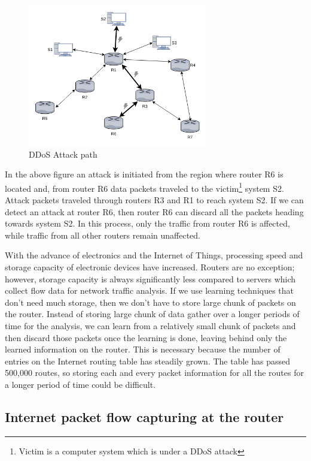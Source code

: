 \documentclass[12pt,oneside,a4paper]{article}
\begin{document}
\begin{figure}[H]
\centering
\includegraphics[width=0.70\textwidth]{attack_path.png}
\caption{DDoS Attack path} \label{fig:attackpath}
\end{figure}


In the above figure an attack is initiated from the region where router R6 is located and, from router R6 data packets traveled to the victim\footnote{Victim is a computer system which is under a DDoS attack} system S2. Attack packets traveled through routers R3 and R1 to reach system S2. If we can detect an attack at router R6, then router R6 can discard all the packets heading towards system S2. In this process, only the traffic from router R6 is affected, while traffic from all other routers remain unaffected.

With the advance of electronics and the Internet of Things, processing speed and storage capacity of electronic devices have increased. Routers are no exception; however, storage capacity is always significantly less compared to servers which collect flow data for network traffic analysis. If we use learning techniques that don't need much storage, then we don't have to store large chunk of packets on the router. Instead of storing large chunk of data gather over a longer periods of time for the analysis, we can learn from a relatively small chunk of packets and then discard those packets once the learning is done, leaving behind only the learned information on the router. This is necessary because the number of entries on the Internet routing table has steadily grown. The table has passed 500,000 routes\cite{routing-tablesize}, so storing each and every packet information for all the routes for a longer period of time could be difficult.\par

\subsection{Internet packet flow capturing at the router}
\end{document}

